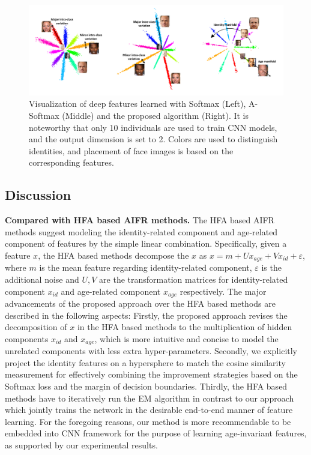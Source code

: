 \documentclass[runningheads]{llncs}
\begin{document}
\begin{figure}[t]
\begin{center}
   \includegraphics[width=1 \linewidth, keepaspectratio]{figures/fig3.pdf}
\end{center}
   \caption{Visualization of deep features learned with Softmax (Left), A-Softmax (Middle) and the proposed algorithm (Right). It is noteworthy that only 10 individuals are used to train CNN models, and the output dimension is set to 2. Colors are used to distinguish identities, and placement of face images is based on the corresponding features.}
\label{fig::3}
\end{figure}

\subsection{Discussion}
\textbf{Compared with HFA based AIFR methods.} The HFA based AIFR methods \cite{hfa,mefa,LFCNN} suggest modeling the identity-related component and age-related component of features by the simple linear combination. Specifically, given a feature $x$, the HFA based methods decompose the $x$ as $x = m + U{x_{age}} + V{x_{id}} + \varepsilon$,
where $m$ is the mean feature regarding identity-related component, $\varepsilon$ is the additional noise and $U, V$ are the transformation matrices for identity-related component $x_{id}$ and age-related component $x_{age}$ respectively. The major advancements of the proposed approach over the HFA based methods are described in the following aspects:
Firstly, the proposed approach revises the decomposition of $x$ in the HFA based methods to the multiplication of hidden components $x_{id}$ and $x_{age}$, which is more intuitive and concise to model the unrelated components with less extra hyper-parameters.
Secondly, we explicitly project the identity features on a hypersphere to match the cosine similarity measurement for effectively combining the improvement strategies based on the Softmax loss and the margin of decision boundaries.
Thirdly, the HFA based methods have to iteratively run the EM algorithm in contrast to our approach which jointly trains the network in the desirable end-to-end manner of feature learning.
For the foregoing reasons, our method is more recommendable to be embedded into CNN framework for the purpose of learning age-invariant features, as supported by our experimental results.
\end{document}
